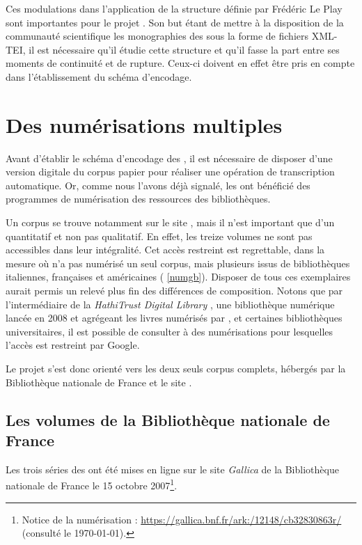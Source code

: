 Ces modulations dans l'application de la structure définie par Frédéric Le Play sont importantes pour le projet \timeus. Son but étant de mettre à la disposition de la communauté scientifique les monographies des \odm{} sous la forme de fichiers XML-TEI, il est nécessaire qu'il étudie cette structure et qu'il fasse la part entre ses moments de continuité et de rupture. Ceux-ci doivent en effet être pris en compte dans l'établissement du schéma d'encodage.

\chapter{Des numérisations multiples}

Avant d'établir le schéma d'encodage des \odm, il est nécessaire de disposer d'une version digitale du corpus \og papier \fg{} pour réaliser une opération de transcription automatique. Or, comme nous l'avons déjà signalé, les \odm{} ont bénéficié des programmes de numérisation des ressources des bibliothèques.

Un corpus se trouve notamment sur le site \gb, mais il n'est important que d'un \pov{} quantitatif et non pas qualitatif. En effet, les treize volumes ne sont pas accessibles dans leur intégralité. Cet accès restreint est regrettable, dans la mesure où \gb{} n'a pas numérisé un seul corpus, mais plusieurs issus de bibliothèques italiennes, françaises et américaines (\ann{} \ref{numgb}). Disposer de tous ces exemplaires aurait permis un relevé plus fin des différences de composition. Notons que par l'intermédiaire de la \textit{HathiTrust Digital Library }, une bibliothèque numérique lancée en 2008 et agrégeant les livres numérisés par \gb, \ia{} et certaines bibliothèques universitaires, il est possible de consulter à des numérisations pour lesquelles l'accès est restreint par Google.

Le projet \timeus{} s'est donc orienté vers les deux seuls corpus complets, hébergés par la Bibliothèque nationale de France et le site \ia.

\section{Les volumes de la Bibliothèque nationale de France}

Les trois séries des \odm{} ont été mises en ligne sur le site \textit{Gallica} de la Bibliothèque nationale de France le 15 octobre 2007\footnote{Notice de la numérisation : \url{https://gallica.bnf.fr/ark:/12148/cb32830863r/} (consulté le \today).}.

